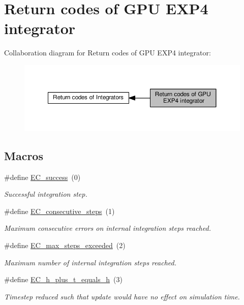 \hypertarget{group__exprb43cu__ErrCodes}{}\section{Return codes of G\+PU E\+X\+P4 integrator}
\label{group__exprb43cu__ErrCodes}
Collaboration diagram for Return codes of G\+PU E\+X\+P4 integrator\+:
\nopagebreak
\begin{figure}[H]
\begin{center}
\leavevmode
\includegraphics[width=350pt]{group__exprb43cu__ErrCodes}
\end{center}
\end{figure}
\subsection*{Macros}
\begin{DoxyCompactItemize}
\item 
\#define \hyperlink{group__exprb43cu__ErrCodes_gabd83bc0f9f475a2189a4db4a08b790ca}{E\+C\+\_\+success}~(0)
\begin{DoxyCompactList}\small\item\em Successful integration step. \end{DoxyCompactList}\item 
\#define \hyperlink{group__exprb43cu__ErrCodes_gae0287841c08f86f5709660fd731615ad}{E\+C\+\_\+consecutive\+\_\+steps}~(1)
\begin{DoxyCompactList}\small\item\em Maximum consecutive errors on internal integration steps reached. \end{DoxyCompactList}\item 
\#define \hyperlink{group__exprb43cu__ErrCodes_ga0f0275d9851ab5c19b79a963d5084df3}{E\+C\+\_\+max\+\_\+steps\+\_\+exceeded}~(2)
\begin{DoxyCompactList}\small\item\em Maximum number of internal integration steps reached. \end{DoxyCompactList}\item 
\#define \hyperlink{group__exprb43cu__ErrCodes_ga9326efd544880e2683c4453365ca2704}{E\+C\+\_\+h\+\_\+plus\+\_\+t\+\_\+equals\+\_\+h}~(3)
\begin{DoxyCompactList}\small\item\em Timestep reduced such that update would have no effect on simulation time. \end{DoxyCompactList}\end{DoxyCompactItemize}


